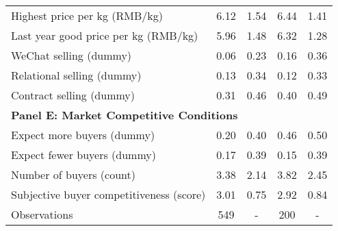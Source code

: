 \begin{table}[htbp]
\begin{tabular}{lcccc}
Highest price per kg (RMB/kg) & 6.12 & 1.54 & 6.44 & 1.41 \\ 
Last year good price per kg (RMB/kg) & 5.96 & 1.48 & 6.32 & 1.28 \\ 
WeChat selling (dummy) & 0.06 & 0.23 & 0.16 & 0.36 \\ 
Relational selling (dummy) & 0.13 & 0.34 & 0.12 & 0.33 \\ 
Contract selling (dummy) & 0.31 & 0.46 & 0.40 & 0.49 \\ 
\hline
\multicolumn{5}{l}{\textbf{Panel E: Market Competitive Conditions}} \\

Expect more buyers (dummy) & 0.20 & 0.40 & 0.46 & 0.50 \\ 
Expect fewer buyers (dummy) & 0.17 & 0.39 & 0.15 & 0.39 \\ 
Number of buyers (count) & 3.38 & 2.14 & 3.82 & 2.45 \\ 
Subjective buyer competitiveness (score) & 3.01 & 0.75 & 2.92 & 0.84 \\ 
\hline
Observations & 549 & - & 200 & - \\
\hline
\end{tabular}
\end{table}
